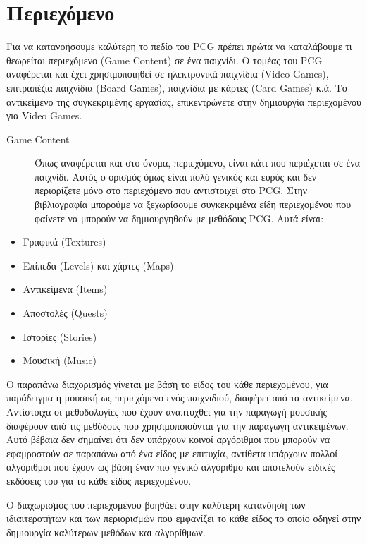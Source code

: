 \section{Περιεχόμενο}
Για να κατανοήσουμε καλύτερη το πεδίο του PCG πρέπει πρώτα να καταλάβουμε τι θεωρείται περιεχόμενο (Game Content) σε ένα παιχνίδι. Ο τομέας του PCG αναφέρεται και έχει χρησιμοποιηθεί σε ηλεκτρονικά παιχνίδια (Video Games), επιτραπέζια παιχνίδια (Board Games), παιχνίδια με κάρτες (Card Games) κ.ά. Το αντικείμενο της συγκεκριμένης εργασίας, επικεντρώνετε στην δημιουργία περιεχομένου για Video Games.

\begin{description}
\item [Game Content] Όπως αναφέρεται και στο όνομα, περιεχόμενο, είναι κάτι που περιέχεται σε ένα παιχνίδι. Αυτός ο ορισμός όμως είναι πολύ γενικός και ευρύς και δεν περιορίζετε μόνο στο περιεχόμενο που αντιστοιχεί στο PCG. Στην βιβλιογραφία μπορούμε να ξεχωρίσουμε συγκεκριμένα είδη περιεχομένου \cite{typesofcontent} που φαίνετε να μπορούν να δημιουργηθούν με μεθόδους PCG. Αυτά είναι:
\end{description}

\begin{itemize}
  \item Γραφικά (Textures)
  \item Επίπεδα (Levels) και χάρτες (Maps)
   \item Αντικείμενα (Items)
   \item Αποστολές (Quests)
   \item Ιστορίες (Stories)
   \item Μουσική (Music)
\end{itemize}

Ο παραπάνω διαχορισμός γίνεται με βάση το είδος του κάθε περιεχομένου, για παράδειγμα η μουσική ως περιεχόμενο ενός παιχνιδιού, διαφέρει από τα αντικείμενα. Αντίστοιχα οι μεθοδολογίες που έχουν αναπτυχθεί για την παραγωγή μουσικής διαφέρουν από τις μεθόδους που χρησιμοποιούνται για την παραγωγή αντικειμένων. Αυτό βέβαια δεν σημαίνει ότι δεν υπάρχουν κοινοί αργόριθμοι που μπορούν να εφαμροστούν σε παραπάνω από ένα είδος με επιτυχία, αντίθετα υπάρχουν πολλοί αλγόριθμοι που έχουν ως βάση έναν πιο γενικό αλγόριθμο και αποτελούν ειδικές εκδόσεις του για το κάθε είδος περιεχομένου.
\par
Ο διαχωρισμός του περιεχομένου βοηθάει στην καλύτερη κατανόηση των ιδιαιτεροτήτων και των περιορισμών που εμφανίζει το κάθε είδος το οποίο οδηγεί στην δημιουργία καλύτερων μεθόδων και αλγορίθμων.

